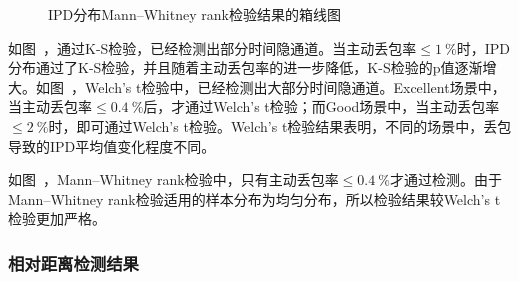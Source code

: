 {	\begin{figure}[htb]
        \centering
        \caption{IPD分布Mann–Whitney rank检验结果的箱线图}
        \label{fig:3:result:ipd:mw}
	\end{figure}
}

如图\ ，通过K-S检验，已经检测出部分时间隐通道。当主动丢包率$\le 1\ \%$时，IPD分布通过了K-S检验，并且随着主动丢包率的进一步降低，K-S检验的p值逐渐增大。如图\ ，Welch's t检验中，已经检测出大部分时间隐通道。Excellent场景中，当主动丢包率$\le 0.4\ \%$后，才通过Welch's t检验；而Good场景中，当主动丢包率$\le 2\ \%$时，即可通过Welch's t检验。Welch's t检验结果表明，不同的场景中，丢包导致的IPD平均值变化程度不同。

如图\ ，Mann–Whitney rank检验中，只有主动丢包率$\le 0.4\ \%$才通过检测。由于Mann–Whitney rank检验适用的样本分布为均匀分布，所以检验结果较Welch's t检验更加严格。

\subsubsection{相对距离检测结果}
\label{chap:analyze:result:ipd:distance}

